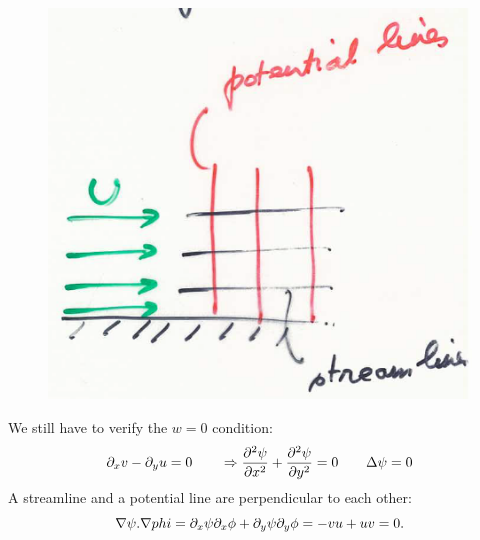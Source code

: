  		\begin{figure}
		\vspace{-5mm}
		\includegraphics[scale=0.4]{ch2/24}
		\end{figure}
		We still have to verify the $w=0$ condition:
 		\begin{equation}
 		\D _x v - \D _y u = 0 \qquad \Rightarrow \frac{\D ^2 \psi}{\D x^2} + \frac{\D ^2 \psi}{\D y^2} = 0 \qquad \Delta \psi = 0
 		\end{equation}
 		A streamline and a potential line are perpendicular to each other:
 		\begin{equation}
 		\nabla \psi . \nabla phi = \D _x \psi \D _x \phi + \D_ y \psi \D _y \phi = -vu + uv = 0. 
 		\end{equation}